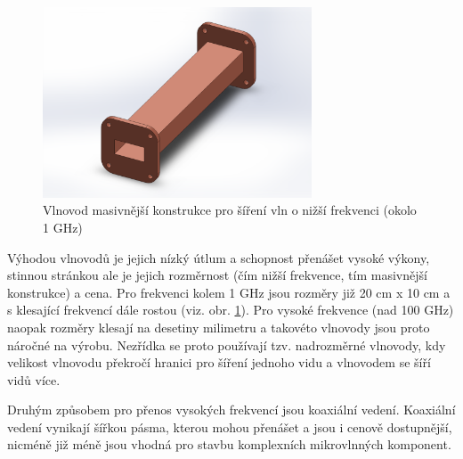 \documentclass[12pt,a4paper,oneside]{article}
\numberwithin{equation}{section} %
\numberwithin{figure}{section} %
\numberwithin{table}{section} %
\begin{document}

\begin{figure}[h] 
\begin{center}
\includegraphics[width=8cm]{vlnovod.pdf}
\caption{Vlnovod masivnější konstrukce pro šíření vln o nižší frekvenci (okolo 1 GHz)}
\label{vlnovod}
\end{center}
\end{figure}

Výhodou vlnovodů je jejich nízký útlum a schopnost přenášet vysoké výkony, stinnou stránkou ale je jejich rozměrnost (čím nižší frekvence, tím masivnější konstrukce) a cena. Pro frekvenci kolem 1 GHz jsou rozměry již 20 cm x 10 cm a s klesající frekvencí dále rostou (viz. obr. \ref{vlnovod}). Pro vysoké frekvence (nad 100 GHz) naopak rozměry klesají na desetiny milimetru a takovéto vlnovody jsou proto náročné na výrobu. Nezřídka se proto používají tzv. nadrozměrné vlnovody, kdy velikost vlnovodu překročí hranici pro šíření jednoho vidu a vlnovodem se šíří vidů více. \cite{Dimensions}

Druhým způsobem pro přenos vysokých frekvencí jsou koaxiální vedení. Koaxiální vedení vynikají šířkou pásma, kterou mohou přenášet a jsou i cenově dostupnější, nicméně již méně jsou vhodná pro stavbu komplexních mikrovlnných komponent.
\end{document}
